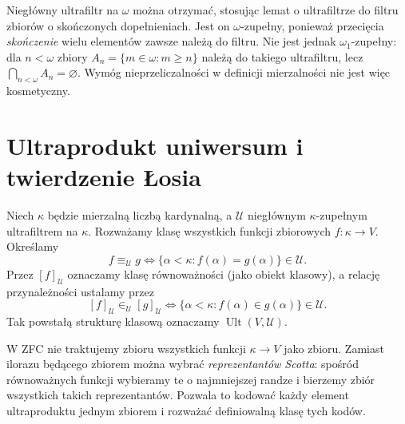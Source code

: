 \begin{przyklad}
\label{ex:lc37-frechet}
Niegłówny ultrafiltr na $\omega$
można otrzymać, stosując lemat o
ultrafiltrze do filtru zbiorów
o skończonych dopełnieniach.
Jest on $\omega$-zupełny, ponieważ
przecięcia \emph{skończenie} wielu
elementów zawsze należą do filtru.
Nie jest jednak $\omega_1$-zupełny:
dla $n<\omega$ zbiory
$A_n=\{m\in\omega:m\ge n\}$
należą do takiego ultrafiltru, lecz
$\bigcap_{n<\omega}A_n=\varnothing$.
Wymóg nieprzeliczalności w definicji
mierzalności nie jest więc kosmetyczny.
\end{przyklad}

\section{Ultraprodukt uniwersum i twierdzenie Łosia}

\begin{definicja}
\label{def:lc37-ultrapower}
Niech $\kappa$ będzie mierzalną liczbą kardynalną, a
$\mathcal U$ niegłównym $\kappa$-zupełnym
ultrafiltrem na $\kappa$. Rozważamy
klasę wszystkich funkcji zbiorowych
$f:\kappa\to V$. Określamy
\[
 f\equiv_{\mathcal U}g
 \iff\{\alpha<\kappa:f(\alpha)=g(\alpha)\}
           \in\mathcal U.
\]
Przez $[f]_{\mathcal U}$ oznaczamy
klasę równoważności (jako obiekt
klasowy), a relację przynależności
ustalamy przez
\[
 [f]_{\mathcal U}\in_{\mathcal U}[g]_{\mathcal U}
 \iff\{\alpha<\kappa:f(\alpha)\in g(\alpha)\}
           \in\mathcal U.
\]
Tak powstałą strukturę klasową
oznaczamy $\operatorname{Ult}(V,\mathcal U)$.
\end{definicja}

\begin{uwaga}
\label{rem:lc37-class-ultrapower}
W ZFC nie traktujemy zbioru wszystkich
funkcji $\kappa\to V$ jako zbioru.
Zamiast ilorazu będącego zbiorem można
wybrać \emph{reprezentantów Scotta}:
spośród równoważnych funkcji wybieramy
te o najmniejszej randze i bierzemy
zbiór wszystkich takich reprezentantów.
Pozwala to kodować każdy element
ultraproduktu jednym zbiorem
i rozważać definiowalną klasę
tych kodów.
\end{uwaga}

